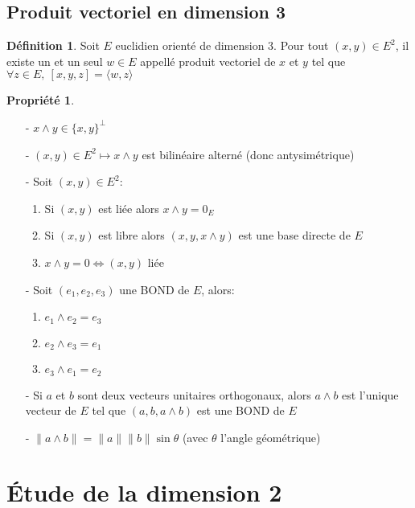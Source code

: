 \documentclass[fleqn]{article}
\theoremstyle{definition} \newtheorem*{defi}{D\'efinition}
\theoremstyle{definition} \newtheorem*{theo}{Th\'eor\`eme}
\theoremstyle{definition} \newtheorem*{coro}{Corollaire}
\theoremstyle{remark} \newtheorem*{rqs}{Remarques}
\theoremstyle{definition} \newtheorem*{prop}{Propri\'et\'e}
\begin{document}
\subsection{Produit vectoriel en dimension 3}

\begin{defi}
	Soit $E$ euclidien orient\'e de dimension 3. Pour tout $(x,y) \in E^2$, il existe un et un seul $w \in E$ appell\'e produit vectoriel de
	$x$ et $y$ tel que $\forall z \in E,\ [x,y,z] = \langle w,z \rangle$
\end{defi}

\begin{prop} $ $
	\begin{enumerate}
		\item [-] $x \wedge y \in \{x,y\}^\perp$
		\item [-] $(x,y) \in E^2 \mapsto x \wedge y$ est bilin\'eaire altern\'e (donc antysim\'etrique)
		\item [-] Soit $(x,y) \in E^2$:
			\begin{enumerate}
				\item Si $(x,y)$ est li\'ee alors $x \wedge y = 0_E$
				\item Si $(x,y)$ est libre alors $(x,y,x \wedge y)$ est une base directe de $E$
				\item $x \wedge y = 0 \Leftrightarrow (x,y)$ li\'ee
			\end{enumerate}
		\item [-] Soit $(e_1, e_2, e_3)$ une BOND de $E$, alors:
			\begin{enumerate}
				\item $e_1 \wedge e_2 = e_3$
				\item $e_2 \wedge e_3 = e_1$
				\item $e_3 \wedge e_1 = e_2$
			\end{enumerate}
		\item [-] Si $a$ et $b$ sont deux vecteurs unitaires orthogonaux, alors $a \wedge b$ est l'unique vecteur de $E$ tel que
			$(a,b,a \wedge b)$ est une BOND de $E$
		\item [-] $\| a \wedge b \| = \|a\| \|b\| \sin \theta$ (avec $\theta$ l'angle g\'eom\'etrique)
	\end{enumerate}
\end{prop}

\section{\'Etude de la dimension 2}
\end{document}
